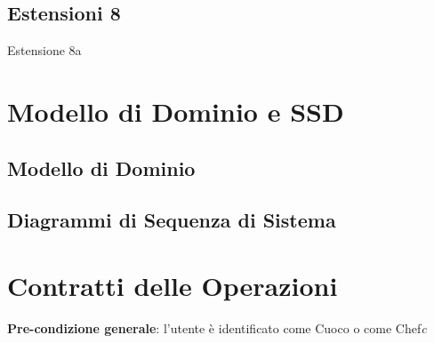 \documentclass[letterpaper, italian]{report}
\begin{document}
\section*{Estensioni 8}
\begin{table}[H]\centering\caption{Estensione 8a}
\end{table}

\chapter{Modello di Dominio e SSD}
\section{Modello di Dominio}
\section{Diagrammi di Sequenza di Sistema}

\chapter{Contratti delle Operazioni}
\textbf{Pre-condizione generale}{: l'utente è identificato come Cuoco o come Chef}\textit{c}
\end{document}
